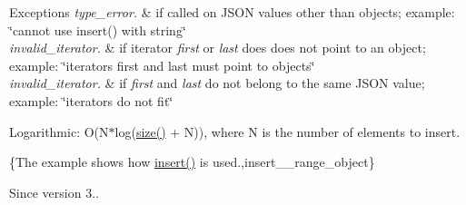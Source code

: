 \begin{DoxyExceptions}{Exceptions}
{\em type\+\_\+error.} & if called on J\+S\+ON values other than objects; example\+: {\ttfamily \char`\"{}cannot use insert() with string\char`\"{}} \\
\hline
{\em invalid\+\_\+iterator.} & if iterator {\itshape first} or {\itshape last} does does not point to an object; example\+: {\ttfamily \char`\"{}iterators first and last must point to
objects\char`\"{}} \\
\hline
{\em invalid\+\_\+iterator.} & if {\itshape first} and {\itshape last} do not belong to the same J\+S\+ON value; example\+: {\ttfamily \char`\"{}iterators do not fit\char`\"{}}\\
\hline
\end{DoxyExceptions}
Logarithmic\+: {\ttfamily O(N$\ast$log(\hyperlink{classnlohmann_1_1basic__json_a25e27ad0c6d53c01871c5485e1f75b96}{size()} + N))}, where {\ttfamily N} is the number of elements to insert.

\{The example shows how {\ttfamily \hyperlink{classnlohmann_1_1basic__json_a0136728f5db69d4051c77b94307abd6c}{insert()}} is used.,insert\+\_\+\+\_\+range\+\_\+object\}

\begin{DoxySince}{Since}
version 3.. 
\end{DoxySince}
